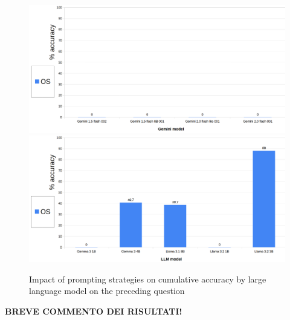 \documentclass[12pt]{article}
\begin{document}
\begin{figure}[H]
    \centering
            \includegraphics[width=1\textwidth]{q205Gemini.png}
            \includegraphics[width=1\textwidth]{q205Other.png}
    \caption[Accuracy on Question 11 by LLM]{Impact of prompting strategies on cumulative accuracy by large language model on the preceding question}
    \end{figure} 
\textbf{BREVE COMMENTO DEI RISULTATI!}

\vspace{1cm}

\end{document}
